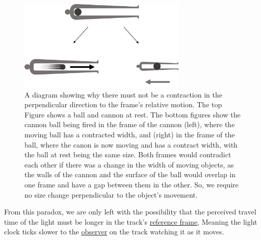 \begin{figure}[H]
	\centering
	\includegraphics[width=8cm]{images/pdf/Cannon_Balls.pdf}
	\caption{A diagram showing why there must not be a contraction in the perpendicular direction to the frame's relative motion. The top Figure shows a ball and cannon at rest. The bottom figures show the cannon ball being fired in the frame of the cannon (left), where the moving ball has a contracted width, and (right) in the frame of the ball, where the canon is now moving and has a contract width, with the ball at rest being the same size. Both frames would contradict each other if there was a change in the width of moving objects, as the walls of the cannon and the surface of the ball would overlap in one frame and have a gap between them in the other. So, we require no size change perpendicular to the object's movement.}
	\label{fig: width contraction}
\end{figure}


From this paradox, we are only left with the possibility that the perceived travel time of the light must be longer in the track's \hyperlink{def-Reference-frame}{reference frame}, Meaning the light clock ticks slower to the \hyperlink{def-observer}{observer} on the track watching it as it moves.

